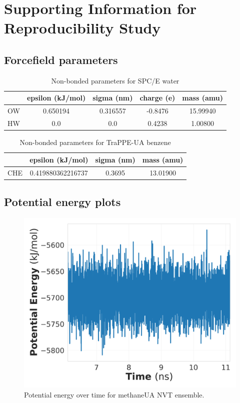 \chapter{Supporting Information for Reproducibility Study}
\label{chap:rep_SI}

\newpage %



\section{Forcefield parameters}
\begin{table}
\caption{Non-bonded parameters for SPC/E water} \label{tab:water}
\centering
\begin{tabular}{lcccc}
   & epsilon (kJ/mol) & sigma (nm) & charge (e) & mass (amu) \\ \hline
OW & 0.650194         & 0.316557   & -0.8476    &  15.99940  \\ 
HW & 0.0              & 0.0        &  0.4238    &  1.00800   \\ \hline
\end{tabular}
\end{table}

\begin{table}
\caption{Non-bonded parameters for TraPPE-UA benzene} \label{tab:bz_nonbond}
\centering
\begin{tabular}{lccc}
    & epsilon (kJ/mol)  & sigma (nm) & mass (amu) \\ \hline
CHE & 0.419880362216737 & 0.3695     &  13.01900  \\ \hline
\end{tabular}
\end{table}

\section{Potential energy plots}
\begin{figure}[h!]
    \centering
    \includegraphics[width=0.8\linewidth,keepaspectratio]{figures/rep_study/methane_pe.png}
    \caption{Potential energy over time for methaneUA NVT ensemble.}\label{fig:methane_pe_evolution}
\end{figure}

